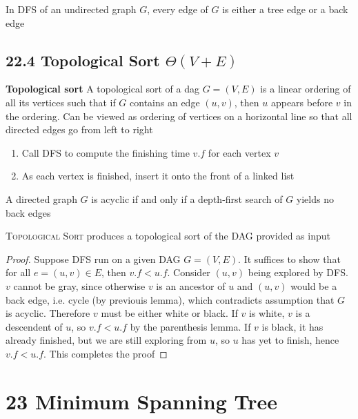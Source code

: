 \documentclass[11pt]{article}
\begin{document}
\begin{theorem*}
    In DFS of an undirected graph $G$, every edge of $G$ is either a tree edge or a back edge 
\end{theorem*}


\subsection*{22.4 Topological Sort $\Theta(V+E)$}

\begin{defn*}
    \textbf{Topological sort} A topological sort of a dag $G = (V,E)$ is a linear ordering of all its vertices such that if $G$ contains an edge $(u,v)$, then $u$ appears before $v$ in the ordering. Can be viewed as ordering of vertices on a horizontal line so that all directed edges go from left to right
    \begin{enumerate}
        \item Call \textsc{DFS} to compute the finishing time $v.f$ for each vertex $v$ 
        \item As each vertex is finished, insert it onto the front of a linked list 
    \end{enumerate}
\end{defn*}

\begin{lemma*}
    A directed graph $G$ is acyclic if and only if a depth-first search of $G$ yields no back edges
\end{lemma*}

\begin{theorem*}
    \textsc{Topological Sort} produces a topological sort of the DAG provided as input 
    \begin{proof}
        Suppose DFS run on a given DAG $G = (V,E)$. It suffices to show that for all $e = (u,v)\in E$, then $v.f < u.f$. Consider $(u,v)$ being explored by DFS. $v$ cannot be gray, since otherwise $v$ is an ancestor of $u$ and $(u,v)$ would be a back edge, i.e. cycle (by previouis lemma), which contradicts assumption that $G$ is acyclic. Therefore $v$ must be either white or black. If $v$ is white, $v$ is a descendent of $u$, so $v.f < u.f$ by the parenthesis lemma. If $v$ is black, it has already finished, but we are still exploring from $u$, so $u$ has yet to finish, hence $v.f < u.f$. This completes the proof
    \end{proof}
\end{theorem*}


\section*{23 Minimum Spanning Tree}
\end{document}
